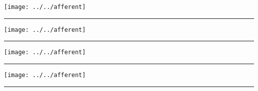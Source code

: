 \documentclass{article}
\begin{document}
\pagestyle{empty}


\texttt{[image: ../../afferent]}
\vfill\hrule\vfill


\texttt{[image: ../../afferent]}
\vfill\hrule\vfill


\texttt{[image: ../../afferent]}
\vfill\hrule\vfill


\texttt{[image: ../../afferent]}
\vfill\hrule\vfill
\end{document}
